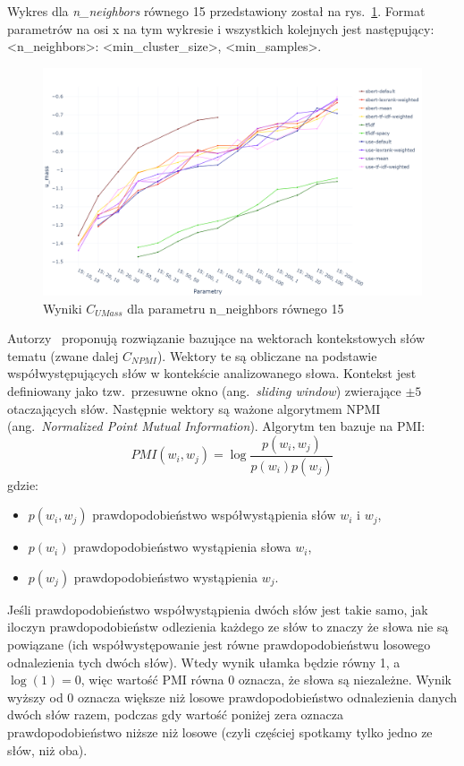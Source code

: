	Wykres dla \emph{n\_neighbors} równego 15 przedstawiony został na rys.~\ref{fig:umass_score}.
	Format parametrów na osi x na tym wykresie i wszystkich kolejnych jest następujący: <n\_neighbors>: <min\_cluster\_size>, <min\_samples>.

	\begin{figure}[htb]
		\centering
		\includegraphics[width=\linewidth]{rys05/c_umass.png}
		\caption{Wyniki \(C_{UMass}\) dla parametru n\_neighbors równego 15}\label{fig:umass_score}
	\end{figure}

	Autorzy~\cite{C_NPMI} proponują rozwiązanie bazujące na wektorach kontekstowych słów tematu (zwane dalej \(C_{NPMI}\)).
	Wektory te są obliczane na podstawie współwystępujących słów w kontekście analizowanego słowa.
	Kontekst jest definiowany jako tzw.\ przesuwne okno (ang.\ \emph{sliding window}) zwierające \(\pm 5\) otaczających słów.
	Następnie wektory są ważone algorytmem NPMI (ang.\ \emph{Normalized Point Mutual Information}).
	Algorytm ten bazuje na PMI\@:
	\[ PMI(w_i,w_j) = \log \frac{p(w_i,w_j)}{p(w_i)p(w_j)} \]
	gdzie:
	\begin{itemize}
		\item \(p(w_i,w_j)\) prawdopodobieństwo współwystąpienia słów \(w_i\) i \(w_j\),
		\item \(p(w_i)\) prawdopodobieństwo wystąpienia słowa \(w_i\),
		\item \(p(w_j)\) prawdopodobieństwo wystąpienia \(w_j\).
	\end{itemize}
	Jeśli prawdopodobieństwo współwystąpienia dwóch słów jest takie samo, jak iloczyn prawdopodobieństw odlezienia każdego ze słów
		to znaczy że słowa nie są powiązane (ich współwystępowanie jest równe prawdopodobieństwu losowego odnalezienia tych dwóch słów).
	Wtedy wynik ułamka będzie równy 1, a \(\log(1)=0\), więc wartość PMI równa 0 oznacza, że słowa są niezależne.
	Wynik wyższy od 0 oznacza większe niż losowe prawdopodobieństwo odnalezienia danych dwóch słów razem,
		podczas gdy wartość poniżej zera oznacza prawdopodobieństwo niższe niż losowe (czyli częściej spotkamy tylko jedno ze słów, niż oba).

